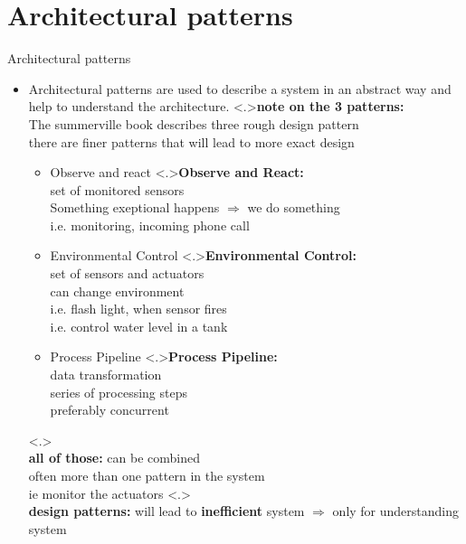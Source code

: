 \documentclass[ngerman={babel}, utf8, bigger, t, xcolor={table,dvipsnames}, ompress, hyperref={bookmarks,colorlinks},red]{beamer}
\begin{document}
\section{Architectural patterns}
\begin{frame}{Architectural patterns}
	\begin{itemize}
		\item Architectural patterns are used to describe a system in an abstract way and help to understand the architecture.
		\note<.>{\textbf{note on the 3 patterns:}\\ The summerville book describes three rough design pattern \\ there are finer patterns that will lead to more exact design}
		\begin{itemize}
			\item Observe and react
			\note<.>{\textbf{Observe and React:}\\ set of monitored sensors \\ Something exeptional happens $\Rightarrow$ we do something \\ i.e. monitoring, incoming phone call}
			\item Environmental Control
			\note<.>{\textbf{Environmental Control:}\\ set of sensors and actuators \\ can change environment \\ i.e. flash light, when sensor fires \\i.e. control water level in a tank}
			\item Process Pipeline
			\note<.>{\textbf{Process Pipeline:}\\ data transformation \\ series of processing steps\\ preferably concurrent}
		\end{itemize}
		\note<.>{\\ \vspace*{1em} \textbf{all of those:} can be combined \\ often more than one pattern in the system \\ ie monitor the actuators}
		\note<.>{\ \\ \vspace*{1em} \textbf{design patterns:} will lead to \textbf{inefficient} system $\Rightarrow$ only for understanding system}
		\end{itemize}
\end{frame}
\end{document}
